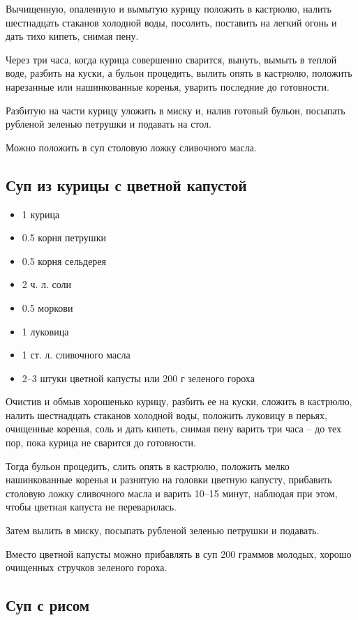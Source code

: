 Вычищенную, опаленную и вымытую курицу положить в кастрюлю, налить шестнадцать стаканов холодной воды, посолить, поставить на легкий огонь и дать тихо кипеть, снимая пену.

Через три часа, когда курица совершенно сварится, вынуть, вымыть в теплой воде, разбить на куски, а бульон процедить, вылить опять в кастрюлю, положить нарезанные или нашинкованные коренья, уварить последние до готовности.

Разбитую на части курицу уложить в миску и, налив готовый бульон, посыпать рубленой зеленью петрушки и подавать на стол.

Можно положить в суп столовую ложку сливочного масла.

\subsection{Суп из курицы с цветной капустой}\label{10sup-cvet-kap}

\begin{itemize}
	\item 1 курица 
	\item 0.5 корня петрушки 
	\item 0.5 корня сельдерея 
	\item 2 ч. л. соли 
	\item 0.5 моркови 
	\item 1 луковица 
	\item 1 ст. л. сливочного масла 
	\item 2–3 штуки цветной капусты или 200 г зеленого гороха
\end{itemize}

Очистив и обмыв хорошенько курицу, разбить ее на куски, сложить в кастрюлю, налить шестнадцать стаканов холодной воды, положить луковицу в перьях, очищенные коренья, соль и дать кипеть, снимая пену варить три часа – до тех пор, пока курица не сварится до готовности.

Тогда бульон процедить, слить опять в кастрюлю, положить мелко нашинкованные коренья и разнятую на головки цветную капусту, прибавить столовую ложку сливочного масла и варить 10–15 минут, наблюдая при этом, чтобы цветная капуста не переварилась.

Затем вылить в миску, посыпать рубленой зеленью петрушки и подавать.

Вместо цветной капусты можно прибавлять в суп 200 граммов молодых, хорошо очищенных стручков зеленого гороха.

\subsection{Суп с рисом}\label{11sup-ris}

